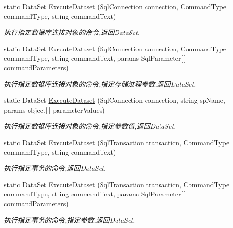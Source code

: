 \begin{DoxyCompactItemize}
static Data\+Set \hyperlink{class_x_c_l_net_tools_1_1_data_base_1_1_m_s_s_q_l_1_1_sql_helper_abf0f5857e88b9f414b00da132dafaebd}{Execute\+Dataset} (Sql\+Connection connection, Command\+Type command\+Type, string command\+Text)
\begin{DoxyCompactList}\small\item\em 执行指定数据库连接对象的命令,返回\+Data\+Set. \end{DoxyCompactList}\item 
static Data\+Set \hyperlink{class_x_c_l_net_tools_1_1_data_base_1_1_m_s_s_q_l_1_1_sql_helper_acf57601c0916a0c6d4f99974ea1de3b3}{Execute\+Dataset} (Sql\+Connection connection, Command\+Type command\+Type, string command\+Text, params Sql\+Parameter\mbox{[}$\,$\mbox{]} command\+Parameters)
\begin{DoxyCompactList}\small\item\em 执行指定数据库连接对象的命令,指定存储过程参数,返回\+Data\+Set. \end{DoxyCompactList}\item 
static Data\+Set \hyperlink{class_x_c_l_net_tools_1_1_data_base_1_1_m_s_s_q_l_1_1_sql_helper_a7fdbbb72fa9cb66dc60b3a17ba417c50}{Execute\+Dataset} (Sql\+Connection connection, string sp\+Name, params object\mbox{[}$\,$\mbox{]} parameter\+Values)
\begin{DoxyCompactList}\small\item\em 执行指定数据库连接对象的命令,指定参数值,返回\+Data\+Set. \end{DoxyCompactList}\item 
static Data\+Set \hyperlink{class_x_c_l_net_tools_1_1_data_base_1_1_m_s_s_q_l_1_1_sql_helper_ab749cf9d9c40a450a3e4cb95b9429b0e}{Execute\+Dataset} (Sql\+Transaction transaction, Command\+Type command\+Type, string command\+Text)
\begin{DoxyCompactList}\small\item\em 执行指定事务的命令,返回\+Data\+Set. \end{DoxyCompactList}\item 
static Data\+Set \hyperlink{class_x_c_l_net_tools_1_1_data_base_1_1_m_s_s_q_l_1_1_sql_helper_a75ca98f1b6021f07cd950802fc935866}{Execute\+Dataset} (Sql\+Transaction transaction, Command\+Type command\+Type, string command\+Text, params Sql\+Parameter\mbox{[}$\,$\mbox{]} command\+Parameters)
\begin{DoxyCompactList}\small\item\em 执行指定事务的命令,指定参数,返回\+Data\+Set. \end{DoxyCompactList}\item 

\end{DoxyCompactItemize}

